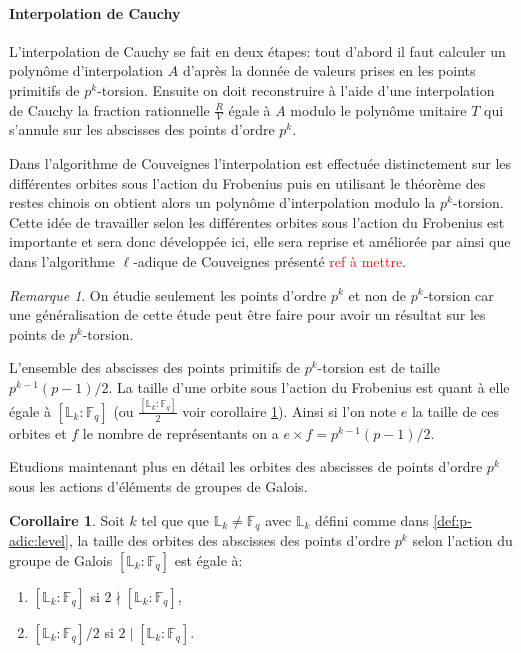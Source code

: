 \documentclass[10pt,a4paper]{book}
\theoremstyle{plain}
\theoremstyle{definition}
\theoremstyle{definition}
\newtheorem{cor}[thm]{Corollaire}
\theoremstyle{definition}
\theoremstyle{definition}
\theoremstyle{remark}
\newtheorem{rem}[thm]{Remarque}
\theoremstyle{remark}
\begin{document}
\paragraph{Interpolation de Cauchy} L'interpolation de Cauchy se fait en deux étapes: tout d'abord il faut calculer un polynôme d'interpolation $A$ d'après la donnée de valeurs prises en les points primitifs de $p^k$-torsion. Ensuite on doit reconstruire à l'aide d'une interpolation de Cauchy la fraction rationnelle $\frac{R}{V}$ égale à $A$ modulo le polynôme unitaire $T$ qui s'annule sur les abscisses des points d'ordre $p^k$. 

Dans l'algorithme de Couveignes \cite{Couveignes96} l'interpolation est effectuée distinctement sur les différentes orbites sous l'action du Frobenius puis en utilisant le théorème des restes chinois on obtient alors un polynôme d'interpolation modulo la $p^k$-torsion. Cette idée de travailler selon les différentes orbites sous l'action du Frobenius est importante et sera donc développée ici, elle sera reprise et améliorée par \cite{DeFeo11} ainsi que dans l'algorithme $\ell$-adique de Couveignes présenté \textcolor{red}{ref à mettre}.

\begin{rem}
On étudie seulement les points d'ordre $p^k$ et non de $p^k$-torsion car une généralisation de cette étude peut être faire pour avoir un résultat sur les points de $p^k$-torsion.
\end{rem}

L'ensemble des abscisses des points primitifs de $p^k$-torsion est de taille $p^{k-1}(p-1)/2$. La taille d'une orbite sous l'action du Frobenius est quant à elle égale à $[\mathbb{L}_k:\mathbb{F}_q]$ (ou $\frac{[\mathbb{L}_k:\mathbb{F}_q]}{2}$ voir corollaire \ref{cor:orb:fro}). Ainsi si l'on note $e$ la taille de ces orbites et $f$ le nombre de représentants on a $e \times f=p^{k-1}(p-1)/2$.

Etudions maintenant plus en détail les orbites des abscisses de points d'ordre $p^k$ sous les actions d'éléments de groupes de Galois.




\begin{cor}
\label{cor:orb:fro}
Soit $k$ tel que que $\mathbb{L}_k \neq \mathbb{F}_q$ avec $\mathbb{L}_k$ défini comme dans \ref{def:p-adic:level}, 
la taille des orbites des abscisses des points d'ordre $p^k$ selon l'action du groupe de Galois $[\mathbb{L}_k:\mathbb{F}_q]$  est égale à:
\begin{enumerate} 
\item $[\mathbb{L}_k:\mathbb{F}_q]$ si $2 \nmid [\mathbb{L}_k:\mathbb{F}_q]$,
\item $[\mathbb{L}_k:\mathbb{F}_q]/2$ si $2 \mid [\mathbb{L}_k:\mathbb{F}_q]$.
\end{enumerate}
\end{cor}
\end{document}
